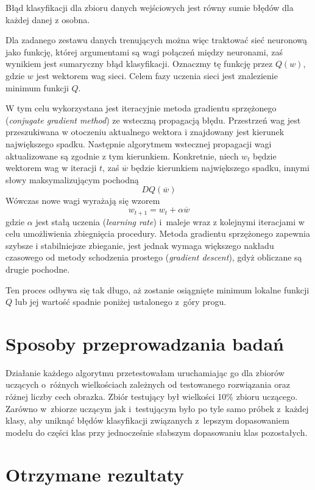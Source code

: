 \documentclass[12pt]{article}
\begin{document}
Błąd klasyfikacji dla zbioru danych wejściowych jest równy sumie błędów dla każdej danej z osobna.

Dla zadanego zestawu danych trenujących można więc traktować sieć neuronową jako funkcję, której argumentami
są wagi połączeń między neuronami, zaś wynikiem jest sumaryczny błąd klasyfikacji.
Oznaczmy tę funkcję przez $Q(w)$, gdzie $w$ jest wektorem wag sieci. 
Celem fazy uczenia sieci jest znalezienie minimum funkcji $Q$.

W tym celu wykorzystana jest iteracyjnie metoda gradientu sprzężonego (\emph{conjugate gradient method})
ze wsteczną propagacją błędu. Przestrzeń wag jest przeszukiwana w otoczeniu aktualnego wektora i 
znajdowany jest kierunek największego spadku. Następnie algorytmem wstecznej propagacji wagi aktualizowane
są zgodnie z tym kierunkiem. Konkretnie, niech $w_t$ będzie wektorem wag w iteracji $t$, zaś $\overline{w}$ 
będzie kierunkiem największego spadku, innymi słowy maksymalizującym pochodną 
\[
    DQ(\overline{w})
\]
Wówczas nowe wagi wyrażają się wzorem
\[
    w_{t+1} = w_t + \alpha \overline{w}
\]
gdzie $\alpha$ jest stałą uczenia (\emph{learning rate}) i~maleje wraz z kolejnymi iteracjami w celu
umożliwienia zbiegnięcia procedury.
Metoda gradientu sprzężonego zapewnia szybsze i stabilniejsze zbieganie, jest jednak wymaga większego nakładu
czasowego od metody schodzenia prostego (\emph{gradient descent}), gdyż obliczane są drugie
pochodne.

Ten proces odbywa się tak długo, aż zostanie osiągnięte minimum lokalne funkcji $Q$ lub 
jej wartość spadnie poniżej ustalonego z~góry progu. 




\section{Sposoby przeprowadzania badań}
Działanie każdego algorytmu przetestowałam uruchamiając go dla zbiorów uczących o~różnych wielkościach zależnych od testowanego rozwiązania oraz różnej liczby cech obrazka. Zbiór testujący był wielkości 10\% zbioru uczącego.
Zarówno w~zbiorze uczącym jak i~testującym było po tyle samo próbek z~każdej klasy, aby uniknąć błędów klasyfikacji związanych z~lepszym dopasowaniem modelu do części klas przy jednocześnie słabszym dopasowaniu klas pozostałych.
\section{Otrzymane rezultaty}
\end{document}
